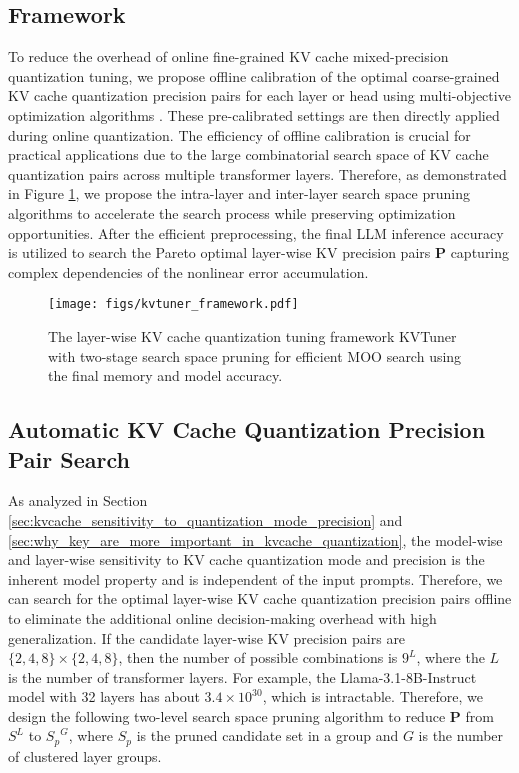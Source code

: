 \subsection{Framework}
To reduce the overhead of online fine-grained KV cache mixed-precision quantization tuning, we propose offline calibration of the optimal coarse-grained KV cache quantization precision pairs for each layer or head using multi-objective optimization algorithms \cite{akiba2019optuna, zhang2007moea}. These pre-calibrated settings are then directly applied during online quantization. The efficiency of offline calibration is crucial for practical applications due to the large combinatorial search space of KV cache quantization pairs across multiple transformer layers. Therefore, as demonstrated in Figure \ref{fig:kvtuner_framework}, we propose the intra-layer and inter-layer search space pruning algorithms to accelerate the search process while preserving optimization opportunities. After the efficient preprocessing, the final LLM inference accuracy is utilized to search the Pareto optimal layer-wise KV precision pairs $\mathbf{P}$ capturing complex dependencies of the nonlinear error accumulation.
\begin{figure}
\centering
\texttt{[image: figs/kvtuner\_framework.pdf]}\vspace{-2mm}    
    \caption{The layer-wise KV cache quantization tuning framework KVTuner with two-stage search space pruning for efficient MOO search using the final memory and model accuracy.}
    \label{fig:kvtuner_framework}\vspace{-2em}
\end{figure}

\subsection{Automatic KV Cache Quantization Precision Pair Search}
As analyzed in Section \ref{sec:kvcache_sensitivity_to_quantization_mode_precision} and \ref{sec:why_key_are_more_important_in_kvcache_quantization}, the model-wise and layer-wise sensitivity to KV cache quantization mode and precision is the inherent model property and is independent of the input prompts. Therefore, we can search for the optimal layer-wise KV cache quantization precision pairs offline to eliminate the additional online decision-making overhead with high generalization. If the candidate layer-wise KV precision pairs are $\{2, 4, 8\} \times \{2, 4, 8\}$, then the number of possible combinations is $9^{L}$, where the $L$ is the number of transformer layers. For example, the Llama-3.1-8B-Instruct model with 32 layers has about $3.4 \times 10^{30}$, which is intractable. Therefore, we design the following two-level search space pruning algorithm to reduce $\mathbf{P}$ from ${S}^{L}$ to ${S_p}^{G}$, where $S_p$ is the pruned candidate set in a group and $G$ is the number of clustered layer groups.



